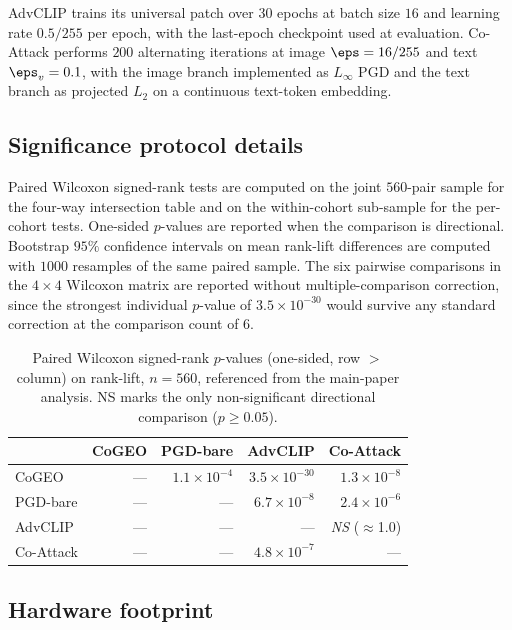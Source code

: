 AdvCLIP trains its universal patch over $30$ epochs at batch size $16$ and learning rate $0.5/255$ per epoch, with the last-epoch checkpoint used at evaluation. Co-Attack performs $200$ alternating iterations at image $\eps = 16/255$ and text $\eps_v = 0.1$, with the image branch implemented as $L_\infty$ PGD and the text branch as projected $L_2$ on a continuous text-token embedding.

\subsection{Significance protocol details}

Paired Wilcoxon signed-rank tests are computed on the joint $560$-pair sample for the four-way intersection table and on the within-cohort sub-sample for the per-cohort tests. One-sided $p$-values are reported when the comparison is directional. Bootstrap $95\%$ confidence intervals on mean rank-lift differences are computed with $1000$ resamples of the same paired sample. The six pairwise comparisons in the $4 \times 4$ Wilcoxon matrix are reported without multiple-comparison correction, since the strongest individual $p$-value of $3.5 \times 10^{-30}$ would survive any standard correction at the comparison count of $6$.

\begin{table}[t]
\centering
\caption{Paired Wilcoxon signed-rank $p$-values (one-sided, row $>$ column) on rank-lift, $n=560$, referenced from the main-paper analysis. NS marks the only non-significant directional comparison ($p \geq 0.05$).}
\label{sm:tab:wilcoxon}
\small
\begin{tabular}{lrrrr}
\toprule
& CoGEO & PGD-bare & AdvCLIP & Co-Attack \\
\midrule
CoGEO     & ---       & $1.1{\times}10^{-4}$ & $3.5{\times}10^{-30}$ & $1.3{\times}10^{-8}$ \\
PGD-bare  & ---       & ---                  & $6.7{\times}10^{-8}$  & $2.4{\times}10^{-6}$ \\
AdvCLIP   & ---       & ---                  & ---                   & \emph{NS} ($\approx$1.0) \\
Co-Attack & ---       & ---                  & $4.8{\times}10^{-7}$  & --- \\
\bottomrule
\end{tabular}
\end{table}

\subsection{Hardware footprint}

